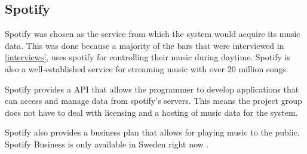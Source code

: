 \subsection{Spotify}
\label{sub:spotify}
Spotify was chosen as the service from which the system would acquire its music data. This was done because a majority of the bars that were interviewed in \cref{interviews}, uses spotify for controlling their music during daytime. Spotify is also a well-established service for streaming music with over 20 million songs.

Spotify provides a API that allows the programmer to develop applications that can access and manage data from spotify’s servers. This means the project group does not have to deal with licensing and a hosting of music data for the system.

Spotify also provides a business plan that allows for playing music to the public. Spotify Business is only available in Sweden right now \cite{spotifyBusiness}.

